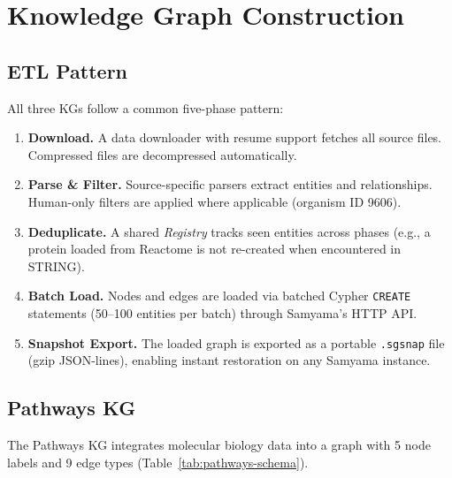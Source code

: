 \documentclass[11pt]{article}
\begin{document}
\section{Knowledge Graph Construction}

\subsection{ETL Pattern}

All three KGs follow a common five-phase pattern:

\begin{enumerate}[leftmargin=*]
  \item \textbf{Download.} A data downloader with resume support fetches all source files. Compressed files are decompressed automatically.
  \item \textbf{Parse \& Filter.} Source-specific parsers extract entities and relationships. Human-only filters are applied where applicable (organism ID 9606).
  \item \textbf{Deduplicate.} A shared \emph{Registry} tracks seen entities across phases (e.g., a protein loaded from Reactome is not re-created when encountered in STRING).
  \item \textbf{Batch Load.} Nodes and edges are loaded via batched Cypher \texttt{CREATE} statements (50--100 entities per batch) through Samyama's HTTP API.
  \item \textbf{Snapshot Export.} The loaded graph is exported as a portable \texttt{.sgsnap} file (gzip JSON-lines), enabling instant restoration on any Samyama instance.
\end{enumerate}

\subsection{Pathways KG}

The Pathways KG integrates molecular biology data into a graph with 5 node labels and 9 edge types (Table~\ref{tab:pathways-schema}).
\end{document}

